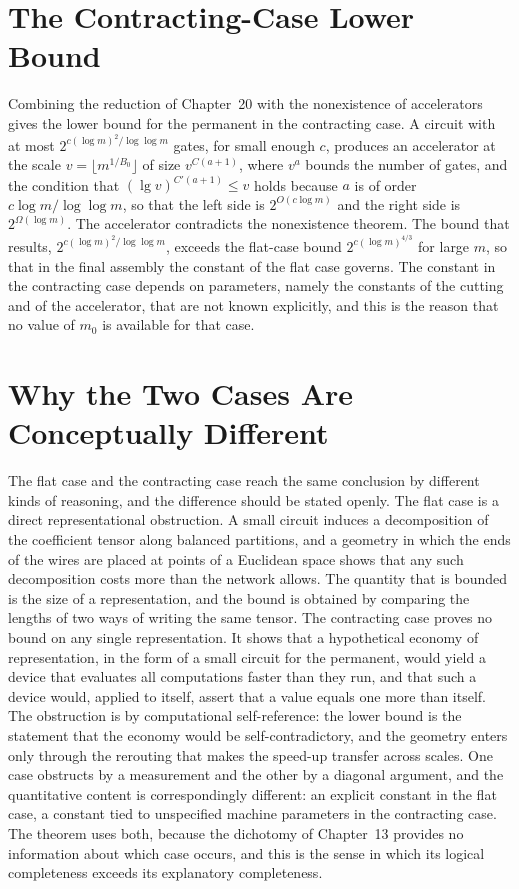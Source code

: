 \documentclass[11pt,letterpaper]{report}
\theoremstyle{plain}
\theoremstyle{definition}
\theoremstyle{remark}
\begin{document}
\section{The Contracting-Case Lower Bound}

Combining the reduction of Chapter~20 with the nonexistence of accelerators gives the lower bound for the permanent in the contracting case. A circuit with at most $2^{c(\log m)^2/\log\log m}$ gates, for small enough $c$, produces an accelerator at the scale $v=\lfloor m^{1/B_0}\rfloor$ of size $v^{C(a+1)}$, where $v^a$ bounds the number of gates, and the condition that $(\lg v)^{C'(a+1)}\le v$ holds because $a$ is of order $c\log m/\log\log m$, so that the left side is $2^{O(c\log m)}$ and the right side is $2^{\Omega(\log m)}$. The accelerator contradicts the nonexistence theorem. The bound that results, $2^{c(\log m)^2/\log\log m}$, exceeds the flat-case bound $2^{c(\log m)^{4/3}}$ for large $m$, so that in the final assembly the constant of the flat case governs. The constant in the contracting case depends on parameters, namely the constants of the cutting and of the accelerator, that are not known explicitly, and this is the reason that no value of $m_0$ is available for that case.

\section{Why the Two Cases Are Conceptually Different}

The flat case and the contracting case reach the same conclusion by different kinds of reasoning, and the difference should be stated openly. The flat case is a direct representational obstruction. A small circuit induces a decomposition of the coefficient tensor along balanced partitions, and a geometry in which the ends of the wires are placed at points of a Euclidean space shows that any such decomposition costs more than the network allows. The quantity that is bounded is the size of a representation, and the bound is obtained by comparing the lengths of two ways of writing the same tensor. The contracting case proves no bound on any single representation. It shows that a hypothetical economy of representation, in the form of a small circuit for the permanent, would yield a device that evaluates all computations faster than they run, and that such a device would, applied to itself, assert that a value equals one more than itself. The obstruction is by computational self-reference: the lower bound is the statement that the economy would be self-contradictory, and the geometry enters only through the rerouting that makes the speed-up transfer across scales. One case obstructs by a measurement and the other by a diagonal argument, and the quantitative content is correspondingly different: an explicit constant in the flat case, a constant tied to unspecified machine parameters in the contracting case. The theorem uses both, because the dichotomy of Chapter~13 provides no information about which case occurs, and this is the sense in which its logical completeness exceeds its explanatory completeness.
\end{document}
